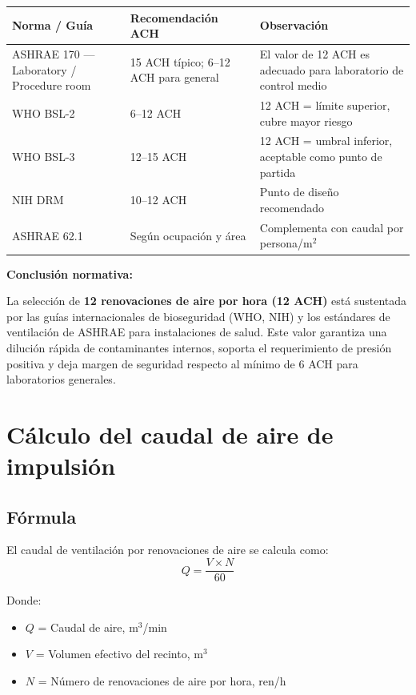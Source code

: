 \documentclass[12pt,a4paper]{article}
\begin{document}
\begin{table}[h!]
\centering
{}
\begin{tabular}{@{}p{5cm}p{4cm}p{6cm}@{}}
\toprule
\textbf{Norma / Guía} & \textbf{Recomendación ACH} & \textbf{Observación} \\
\midrule
ASHRAE 170 --- Laboratory / Procedure room & 15 ACH típico; 6--12 ACH para general & El valor de 12 ACH es adecuado para laboratorio de control medio \\
WHO BSL-2 & 6--12 ACH & 12 ACH = límite superior, cubre mayor riesgo \\
WHO BSL-3 & 12--15 ACH & 12 ACH = umbral inferior, aceptable como punto de partida \\
NIH DRM & 10--12 ACH & Punto de diseño recomendado \\
ASHRAE 62.1 & Según ocupación y área & Complementa con caudal por persona/m$^2$ \\
\bottomrule
\end{tabular}
\end{table}

\textbf{Conclusión normativa:}

La selección de \textbf{12 renovaciones de aire por hora (12 ACH)} está sustentada por las guías internacionales de bioseguridad (WHO, NIH) y los estándares de ventilación de ASHRAE para instalaciones de salud. Este valor garantiza una dilución rápida de contaminantes internos, soporta el requerimiento de presión positiva y deja margen de seguridad respecto al mínimo de 6 ACH para laboratorios generales.

\section{Cálculo del caudal de aire de impulsión}

\subsection{Fórmula}

El caudal de ventilación por renovaciones de aire se calcula como:
\[
Q = \frac{V \times N}{60}
\]

Donde:
\begin{itemize}[leftmargin=*]
    \item $Q$ = Caudal de aire, m$^3$/min
    \item $V$ = Volumen efectivo del recinto, m$^3$
    \item $N$ = Número de renovaciones de aire por hora, ren/h
\end{itemize}
\end{document}
